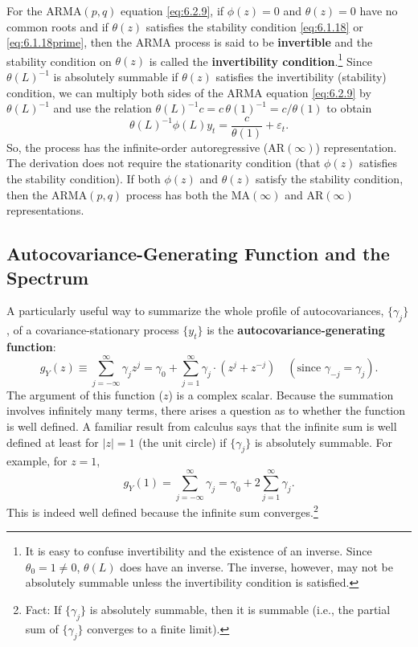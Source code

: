 For the $\text{ARMA}(p, q)$ equation \eqref{eq:6.2.9}, if $\phi(z) = 0$ and $\theta(z) = 0$ have no common
roots and if $\theta(z)$ satisfies the stability condition \eqref{eq:6.1.18} or \eqref{eq:6.1.18prime}, then the
ARMA process is said to be \textbf{invertible} and the stability condition on $\theta(z)$ is called
the \textbf{invertibility condition}.\footnote{It is easy to confuse invertibility and the existence of an inverse. Since $\theta_0 = 1 \neq 0$, $\theta(L)$ does have an inverse. The inverse, however, may not be absolutely summable unless the invertibility condition is satisfied.}
Since $\theta(L)^{-1}$ is absolutely summable if $\theta(z)$ satisfies
the invertibility (stability) condition, we can multiply both sides of the ARMA
equation \eqref{eq:6.2.9} by $\theta(L)^{-1}$ and use the relation $\theta(L)^{-1} c = c\,\theta(1)^{-1} = c/\theta(1)$ to
obtain
\begin{equation}
  \theta(L)^{-1} \phi(L) y_t = \frac{c}{\theta(1)} + \varepsilon_t.
  \label{eq:6.2.13}
\end{equation}
So, the process has the infinite-order autoregressive ($\text{AR}(\infty)$) representation. The
derivation does not require the stationarity condition (that $\phi(z)$ satisfies the stability
condition). If both $\phi(z)$ and $\theta(z)$ satisfy the stability condition, then the
$\text{ARMA}(p, q)$ process has both the $\text{MA}(\infty)$ and $\text{AR}(\infty)$ representations.

\subsection*{Autocovariance-Generating Function and the Spectrum}

A particularly useful way to summarize the whole profile of autocovariances,
$\{\gamma_j\}$, of a covariance-stationary process $\{y_t\}$ is the \textbf{autocovariance-generating
function}:
\begin{equation}
  g_Y(z) \equiv \sum_{j=-\infty}^{\infty} \gamma_j z^j
  = \gamma_0 + \sum_{j=1}^{\infty} \gamma_j \cdot (z^j + z^{-j})
  \quad (\text{since } \gamma_{-j} = \gamma_j).
  \label{eq:6.2.14}
\end{equation}
The argument of this function ($z$) is a complex scalar. Because the summation
involves infinitely many terms, there arises a question as to whether the function
is well defined. A familiar result from calculus says that the infinite sum is well
defined at least for $|z| = 1$ (the unit circle) if $\{\gamma_j\}$ is absolutely summable. For
example, for $z = 1$,
\begin{equation}
  g_Y(1) = \sum_{j=-\infty}^{\infty} \gamma_j = \gamma_0 + 2 \sum_{j=1}^{\infty} \gamma_j.
  \label{eq:6.2.15}
\end{equation}
This is indeed well defined because the infinite sum converges.\footnote{Fact: If $\{\gamma_j\}$ is absolutely summable, then it is summable (i.e., the partial sum of $\{\gamma_j\}$ converges to a finite limit).}

